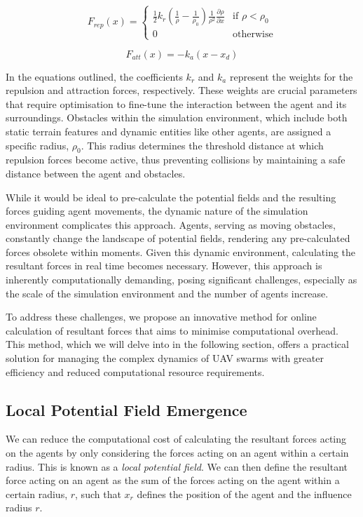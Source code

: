 \documentclass[12pt]{article}
\begin{document}
\begin{equation}
    F_{rep}(x) = 
    \begin{cases}
        \frac{1}{2}k_r(\frac{1}{\rho}-\frac{1}{\rho_0})\frac{1}{\rho^2}\frac{\partial \rho}{\partial x} & \text{if } \rho < \rho_0 \\
        0 & \text{otherwise}
    \end{cases}
\end{equation}

\begin{equation}
    F_{att}(x) = -k_a(x-x_d)
\end{equation}

In the equations outlined, the coefficients \(k_r\) and \(k_a\) represent the weights for the repulsion and attraction forces, respectively. These weights are crucial parameters that require optimisation to fine-tune the interaction between the agent and its surroundings. Obstacles within the simulation environment, which include both static terrain features and dynamic entities like other agents, are assigned a specific radius, \(\rho_0\). This radius determines the threshold distance at which repulsion forces become active, thus preventing collisions by maintaining a safe distance between the agent and obstacles.

While it would be ideal to pre-calculate the potential fields and the resulting forces guiding agent movements, the dynamic nature of the simulation environment complicates this approach. Agents, serving as moving obstacles, constantly change the landscape of potential fields, rendering any pre-calculated forces obsolete within moments. Given this dynamic environment, calculating the resultant forces in real time becomes necessary. However, this approach is inherently computationally demanding, posing significant challenges, especially as the scale of the simulation environment and the number of agents increase.

To address these challenges, we propose an innovative method for online calculation of resultant forces that aims to minimise computational overhead. This method, which we will delve into in the following section, offers a practical solution for managing the complex dynamics of UAV swarms with greater efficiency and reduced computational resource requirements.

\subsection{Local Potential Field Emergence}
\label{sec:lpfe}
We can reduce the computational cost of calculating the resultant forces acting on the agents by only considering the forces acting on an agent within a certain radius. This is known as a \emph{local potential field}. We can then define the resultant force acting on an agent as the sum of the forces acting on the agent within a certain radius, $r$, such that $x_r$ defines the position of the agent and the influence radius $r$.
\end{document}
